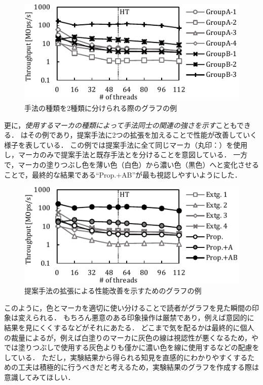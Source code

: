 \begin{figure}[t]
  \centering
  \includegraphics{./figures/graph-grouped_methods.pdf}
  \caption{手法の種類を2種類に分けられる際のグラフの例}
  \label{fig:sample_grouped}
\end{figure}

更に，\emph{使用するマーカの種類によって手法同士の関連の強さを示す}こともできる．
\Fig{\ref{fig:sample_paired}}はその例であり，提案手法に2つの拡張を加えることで性能が改善していく様子を表している．
この例では提案手法に全て同じマーカ（丸印：\circ）を使用し，マーカのみで提案手法と既存手法とを分けることを意図している．
一方で，マーカの塗りつぶし色を薄い色（白色）から濃い色（黒色）へと変化させることで，最終的な結果である``Prop.+AB''が最も視認しやすいようにした．

\begin{figure}[t]
  \centering
  \includegraphics{./figures/graph-paired_methods.pdf}
  \caption{提案手法の拡張による性能改善を示すためのグラフの例}
  \label{fig:sample_paired}
\end{figure}

このように，色とマーカを適切に使い分けることで読者がグラフを見た瞬間の印象は変えられる．
もちろん悪意のある印象操作は厳禁であり，例えば意図的に結果を見にくくするなどがそれにあたる．
どこまで気を配るかは最終的に個人の裁量によるが，例えば白塗りのマーカに灰色の線は視認性が悪くなるため，\Fig{\ref{fig:sample_grouped}}や\Fig{\ref{fig:sample_paired}}では塗りつぶしで使用する灰色よりも僅かに濃い色を線に使用するなどの配慮をしている．
ただし，実験結果から得られる知見を直感的にわかりやすくするための工夫は積極的に行うべきだと考えるため，実験結果のグラフを作成する際は意識してみてほしい．



